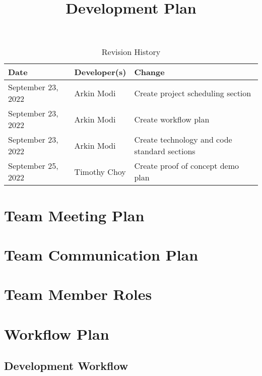 \documentclass{article}
\title{Development Plan\\\progname}
\author{\authname}
\date{}
\begin{document}
\begin{table}[hp]
\caption{Revision History} \label{TblRevisionHistory}
\begin{tabularx}{\textwidth}{llX}
\toprule
\textbf{Date} & \textbf{Developer(s)} & \textbf{Change}\\
\midrule
September 23, 2022 & Arkin Modi & Create project scheduling section\\
September 23, 2022 & Arkin Modi & Create workflow plan\\
September 23, 2022 & Arkin Modi & Create technology and code standard sections\\
September 25, 2022 & Timothy Choy & Create proof of concept demo plan\\
\bottomrule
\end{tabularx}
\end{table}

\newpage

\maketitle


\section{Team Meeting Plan}

\section{Team Communication Plan}

\section{Team Member Roles}

\section{Workflow Plan}


\subsection{Development Workflow}
\end{document}

